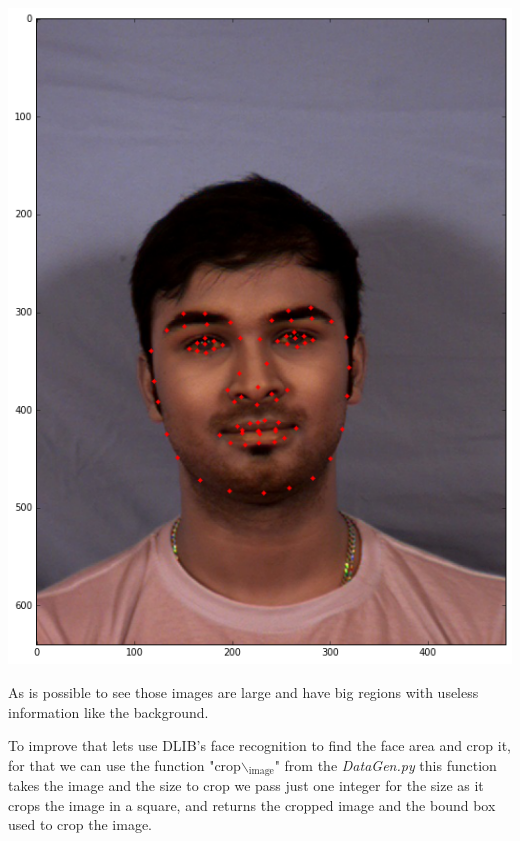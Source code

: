 \documentclass[11pt]{article}
\begin{document}
\begin{center}
\includegraphics[width=.9\linewidth]{./images/example2.png}
\end{center}

As is possible to see those images are large and have big regions with
useless information like the background.

To improve that lets use DLIB's face recognition to find the face area and
crop it, for that we can use the function "crop$\backslash$\(_{\text{image}}\)" from the \emph{DataGen.py} 
this function takes the image and the size to crop we pass just one integer
for the size as it crops the image in a square, and returns the cropped image
and the bound box used to crop the image. 
\end{document}
